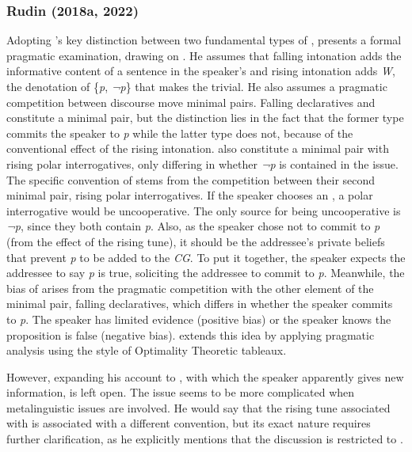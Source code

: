 \documentclass[output=paper,colorlinks,citecolor=brown]{langscibook}
\begin{document}
\subsubsection{Rudin (2018a, 2022)}
\label{sec:Rudin:Hong}

Adopting \citet{jeong2018intonation}'s key distinction between two fundamental types of , \citet{rudin2018risinga} presents a formal pragmatic examination, drawing on \citet{farkas2010reacting}. He assumes that falling intonation adds the informative content of a sentence in the speaker’s  and rising intonation adds \textit{W}, the denotation of \{\textit{p}, \textit{¬p}\} that makes the  trivial. He also assumes a pragmatic competition between discourse move minimal pairs. Falling declaratives and  constitute a minimal pair, but the distinction lies in the fact that the former type commits the speaker to \textit{p} while the latter type does not, because of the conventional effect of the rising intonation.  also constitute a minimal pair with rising polar interrogatives, only differing in whether \textit{¬p} is contained in the issue. The specific convention of  stems from the competition between their second minimal pair, rising polar interrogatives. If the speaker chooses an , a polar interrogative would be uncooperative. The only source for being uncooperative is \textit{¬p}, since they both contain \textit{p}. Also, as the speaker chose not to commit to \textit{p} (from the effect of the rising tune), it should be the addressee’s private beliefs that prevent \textit{p} to be added to the \textit{CG}. To put it together, the speaker expects the addressee to say \textit{p} is true, soliciting the addressee to commit to \textit{p}. Meanwhile, the bias of  arises from the pragmatic competition with the other element of the minimal pair, falling declaratives, which differs in whether the speaker commits to \textit{p}. The speaker has limited evidence (positive bias) or the speaker knows the proposition is false (negative bias). \citet{rudin2022intonational} extends this idea by applying pragmatic analysis using the style of Optimality Theoretic tableaux.

However, expanding his account to , with which the speaker apparently gives new information, is left open. The issue seems to be more complicated when metalinguistic issues are involved. He would say that the rising tune associated with  is associated with a different convention, but its exact nature requires further clarification, as he explicitly mentions that the discussion is restricted to .
\end{document}
